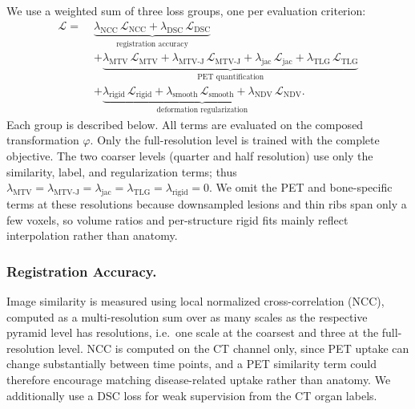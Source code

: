 \subsection{}
\label{sec:losses}
We use a weighted sum of three loss groups, one per evaluation criterion:
\begin{equation}
  \begin{aligned}
    \mathcal{L} = \;
      & \underbrace{\lambda_{\mathrm{NCC}}\,\mathcal{L}_{\mathrm{NCC}}
      + \lambda_{\mathrm{DSC}}\,\mathcal{L}_{\mathrm{DSC}}}_{\text{registration accuracy}} \\
      & + \underbrace{\lambda_{\mathrm{MTV}}\,\mathcal{L}_{\mathrm{MTV}}
      + \lambda_{\mathrm{MTV\text{-}J}}\,\mathcal{L}_{\mathrm{MTV\text{-}J}}
      + \lambda_{\mathrm{jac}}\,\mathcal{L}_{\mathrm{jac}}
      + \lambda_{\mathrm{TLG}}\,\mathcal{L}_{\mathrm{TLG}}}_{\text{PET quantification}} \\
      & + \underbrace{\lambda_{\mathrm{rigid}}\,\mathcal{L}_{\mathrm{rigid}}
      + \lambda_{\mathrm{smooth}}\,\mathcal{L}_{\mathrm{smooth}}
      + \lambda_{\mathrm{NDV}}\,\mathcal{L}_{\mathrm{NDV}}}_{\text{deformation regularization}} .
  \end{aligned}
  \label{eq:total}
\end{equation}
Each group is described below.
All terms are evaluated on the composed transformation $\varphi$.
Only the full-resolution level is trained with the complete objective.
The two coarser levels (quarter and half resolution) use only the similarity, label, and regularization terms; thus $\lambda_{\mathrm{MTV}} = \lambda_{\mathrm{MTV\text{-}J}} = \lambda_{\mathrm{jac}} = \lambda_{\mathrm{TLG}} = \lambda_{\mathrm{rigid}} = 0$.
We omit the PET and bone-specific terms at these resolutions because downsampled lesions and thin ribs span only a few voxels, so volume ratios and per-structure rigid fits mainly reflect interpolation rather than anatomy.

\subsubsection{Registration Accuracy.}
Image similarity is measured using local normalized cross-correlation (NCC), computed as a multi-resolution sum over as many scales as the respective pyramid level has resolutions, i.e.\ one scale at the coarsest and three at the full-resolution level.
NCC is computed on the CT channel only, since PET uptake can change substantially between time points, and a PET similarity term could therefore encourage matching disease-related uptake rather than anatomy.
We additionally use a DSC loss for weak supervision from the CT organ labels.





